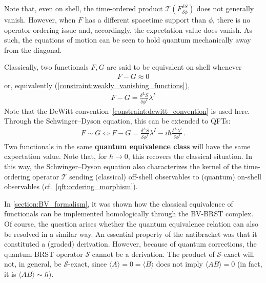     Note that, even on shell, the time-ordered product $\mathcal{T}\left(F\frac{\delta S}{\delta\phi}\right)$ does not generally vanish. However, when $F$ has a different spacetime support than $\phi$, there is no operator-ordering issue and, accordingly, the expectation value does vanish. As such, the equations of motion can be seen to hold quantum mechanically away from the diagonal.

    \begin{property}
        Classically, two functionals $F,G$ are said to be equivalent on shell whenever
        \begin{gather}
            F-G \approx 0
        \end{gather}
        or, equivalently (\cref{constraint:weakly_vanishing_functions}),
        \begin{gather}
            F-G = \frac{\delta^LS}{\delta\phi^I}\lambda^I
        \end{gather}
        Note that the DeWitt convention~\eqref{constraint:dewitt_convention} is used here. Through the Schwinger--Dyson equation, this can be extended to QFTs:
        \begin{gather}
            F\sim G\iff F-G = \frac{\delta^LS}{\delta\phi^I}\lambda^I-i\hbar\frac{\delta^L\lambda^I}{\delta\phi^I}\,.
        \end{gather}
        Two functionals in the same \textbf{quantum equivalence class} will have the same expectation value. Note that, for $\hbar\longrightarrow0$, this recovers the classical situation. In this way, the Schwinger--Dyson equation also characterizes the kernel of the time-ordering operator $\mathcal{T}$ sending (classical) off-shell observables to (quantum) on-shell observables (cf.~\cref{qft:ordering_morphism}).
    \end{property}

    In \cref{section:BV_formalism}, it was shown how the classical equivalence of functionals can be implemented homologically through the BV-BRST complex. Of course, the question arises whether the quantum equivalence relation can also be resolved in a similar way. An essential property of the antibracket was that it constituted a (graded) derivation. However, because of quantum corrections, the quantum BRST operator $\mathcal{S}$ cannot be a derivation. The product of $\mathcal{S}$-exact will not, in general, be $\mathcal{S}$-exact, since $\langle A\rangle = 0 = \langle B\rangle$ does not imply $\langle AB \rangle=0$ (in fact, it is $\langle AB \rangle\sim\hbar$).

